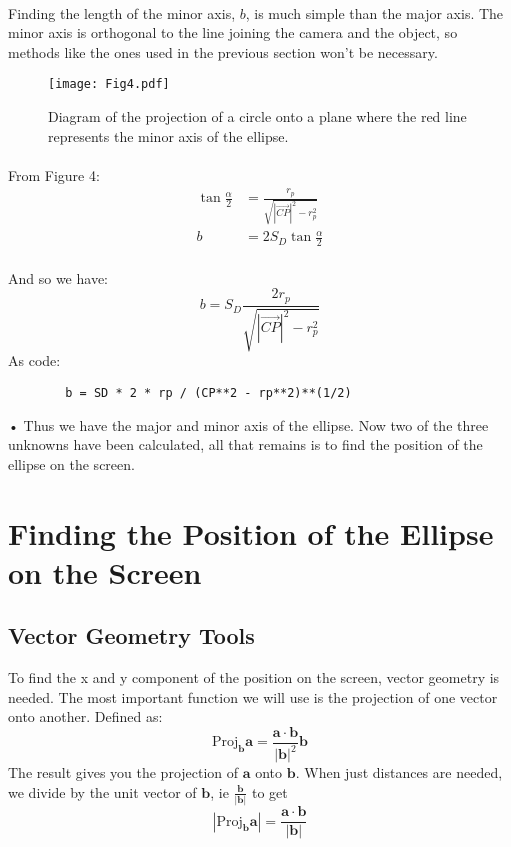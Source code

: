 \documentclass{article}
\newcommand\cpv{\overrightarrow{CP}\xspace}
\begin{document}
	\paragraph{}	
	Finding the length of the minor axis, $b$, is much simple than the major axis. The minor axis is orthogonal to the line joining the camera 
	and the object, so methods like the ones used in the previous section won't be necessary. 
	\begin{figure}[H]
		\texttt{[image: Fig4.pdf]}
		\caption{Diagram of the projection of a circle onto a plane where the red line represents the minor axis of the ellipse.}	
	\end{figure}
	\paragraph{}
	From Figure 4:
	\begin{align*}
		\tan{\frac{\alpha}{2}} & = \frac{r_p}{\sqrt{\left|\cpv\right|^2 - r_p^2}} \\
		b & = 2 S_D \tan{\frac{\alpha}{2}}
	\end{align*}
	\paragraph{}
	And so we have:
	\begin{equation}
		b = S_D \frac{2 r_p}{\sqrt{\left|\cpv\right|^2 - r_p^2}}
	\end{equation}
	As code:
	\begin{verbatim}
		b = SD * 2 * rp / (CP**2 - rp**2)**(1/2)
	\end{verbatim}•
	Thus we have the major and minor axis of the ellipse. Now two of the three unknowns have been calculated, all that remains is to find the 	position of the ellipse on the screen.
	
\section{Finding the Position of the Ellipse on the Screen}
	\subsection{Vector Geometry Tools}
	To find the x and y component of the position on the screen, vector geometry is needed. The most important function we will use is the 
	projection of one vector onto another. Defined as:
	$$ \text{Proj}_{\mathbf{b}}\mathbf{a} = \frac{\mathbf{a} \cdot \mathbf{b}}{|\mathbf{b}|^2} \mathbf{b} $$
	The result gives you the projection of $\mathbf{a}$ onto $\mathbf{b}$. When just distances are needed, we divide 
	by the unit vector of $\mathbf{b}$, ie $\frac{\mathbf{b}}{|\mathbf{b}|}$ to get
	$$ \left|\text{Proj}_\mathbf{b} \mathbf{a}\right| = \frac{\mathbf{a} \cdot \mathbf{b}}{|\mathbf{b}|} $$ 
\end{document}
